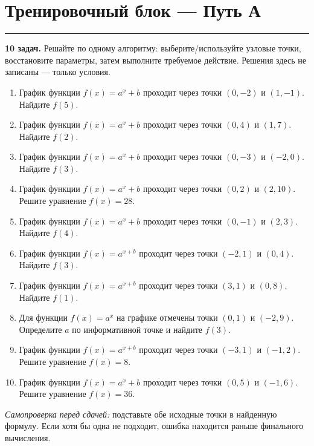 \documentclass[a4paper,12pt]{article}
\newcommand{\sectionline}{\par\vspace{2pt}\noindent\color{accent}\rule{\linewidth}{0.6pt}\par\color{textgray}\vspace{4pt}}
\begin{document}
\clearpage
\section*{Тренировочный блок — Путь А}
\sectionline
\textbf{10 задач.} Решайте по одному алгоритму: выберите/используйте узловые точки, восстановите параметры, затем выполните требуемое действие. Решения здесь не записаны — только условия.

\begin{enumerate}[label=\textbf{\arabic*.}]
  \item График функции $f(x)=a^x+b$ проходит через точки $(0,-2)$ и $(1,-1)$. Найдите $f(5)$.

  \item График функции $f(x)=a^x+b$ проходит через точки $(0,4)$ и $(1,7)$. Найдите $f(2)$.

  \item График функции $f(x)=a^x+b$ проходит через точки $(0,-3)$ и $(-2,0)$. Найдите $f(3)$.

  \item График функции $f(x)=a^x+b$ проходит через точки $(0,2)$ и $(2,10)$. Решите уравнение $f(x)=28$.

  \item График функции $f(x)=a^x+b$ проходит через точки $(0,-1)$ и $(2,3)$. Найдите $f(4)$.

  \item График функции $f(x)=a^{x+b}$ проходит через точки $(-2,1)$ и $(0,4)$. Найдите $f(3)$.

  \item График функции $f(x)=a^{x+b}$ проходит через точки $(3,1)$ и $(0,8)$. Найдите $f(1)$.

  \item Для функции $f(x)=a^x$ на графике отмечены точки $(0,1)$ и $(-2,9)$. Определите $a$ по информативной точке и найдите $f(3)$.

  \item График функции $f(x)=a^{x+b}$ проходит через точки $(-3,1)$ и $(-1,2)$. Решите уравнение $f(x)=8$.

  \item График функции $f(x)=a^x+b$ проходит через точки $(0,5)$ и $(-1,6)$. Решите уравнение $f(x)=36$.
\end{enumerate}

\vfill
\textit{Самопроверка перед сдачей:} подставьте обе исходные точки в найденную формулу. Если хотя бы одна не подходит, ошибка находится раньше финального вычисления.
\end{document}
